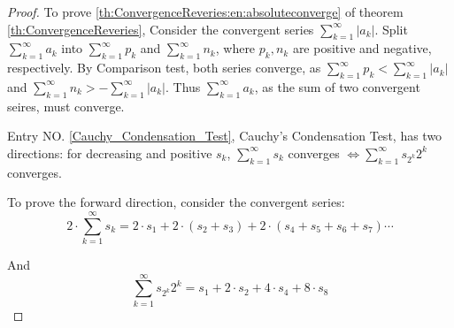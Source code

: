\documentclass[../note.tex]{subfiles}
\begin{document}
\begin{proof}

	To prove \ref{th:ConvergenceReveries:en:absoluteconverge} of theorem \ref{th:ConvergenceReveries},
	Consider the convergent series $\sum^{\infty}_{k=1}|a_k|$.
	Split $\sum^{\infty}_{k=1}a_k$ into $\sum^{\infty}_{k=1}p_k$ and $\sum^{\infty}_{k=1}n_k$, where $p_k, n_k$ are positive and negative, respectively.
	By Comparison test, both series converge, as $\sum^{\infty}_{k=1}p_k <\sum^{\infty}_{k=1}|a_k| $ and $\sum^{\infty}_{k=1}n_k > -\sum^{\infty}_{k=1}|a_k|$. Thus $\sum^{\infty}_{k=1}a_k$, as the sum of two convergent seires, must converge.

	Entry NO. \ref{Cauchy_Condensation_Test}, Cauchy's Condensation Test, has two directions: for decreasing and positive $s_k$, $\sum^{\infty}_{k=1}s_k$ converges $\iff \sum^{\infty}_{k=1}s_{2^k}2^k$ converges.

	To prove the forward direction, consider the convergent series:
	\[
		2\cdot \sum^{\infty}_{k=1}s_k =
		2\cdot s_1 + 2 \cdot (s_2+s_3) + 2 \cdot (s_4+s_5+s_6+s_7) \cdots
	\]

	And 
	\[
		\sum^{\infty}_{k=1}s_{2^k}2^k = s_1+2\cdot s_2 + 4\cdot s_4 + 8 \cdot s_8
	\]

	


\end{proof}
\end{document}
